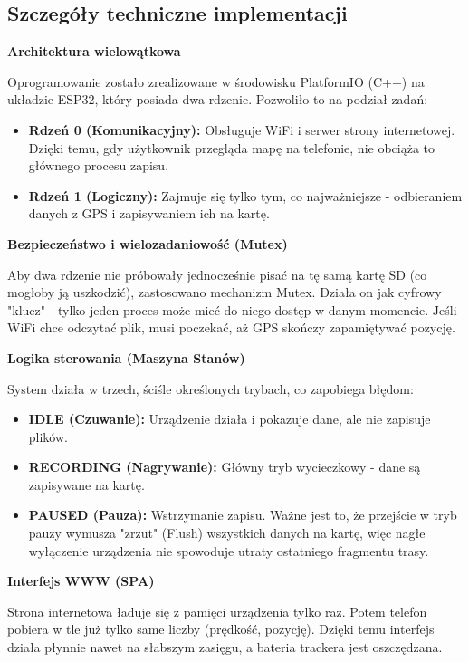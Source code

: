 \documentclass[12pt, a4paper]{EE-dyplom}
\begin{document}
\subsection{Szczegóły techniczne implementacji}

\textbf{Architektura wielowątkowa}

Oprogramowanie zostało zrealizowane w środowisku PlatformIO (C++) na układzie ESP32, który posiada dwa rdzenie. Pozwoliło to na podział zadań:
\begin{itemize}
    \item \textbf{Rdzeń 0 (Komunikacyjny):} Obsługuje WiFi i serwer strony internetowej. Dzięki temu, gdy użytkownik przegląda mapę na telefonie, nie obciąża to głównego procesu zapisu.
    \item \textbf{Rdzeń 1 (Logiczny):} Zajmuje się tylko tym, co najważniejsze - odbieraniem danych z GPS i zapisywaniem ich na kartę.
\end{itemize}

\vspace{0.5cm}
\textbf{Bezpieczeństwo i wielozadaniowość (Mutex)}

Aby dwa rdzenie nie próbowały jednocześnie pisać na tę samą kartę SD (co mogłoby ją uszkodzić), zastosowano mechanizm Mutex. Działa on jak cyfrowy "klucz" - tylko jeden proces może mieć do niego dostęp w danym momencie. Jeśli WiFi chce odczytać plik, musi poczekać, aż GPS skończy zapamiętywać pozycję.

\vspace{0.5cm}
\textbf{Logika sterowania (Maszyna Stanów)}

System działa w trzech, ściśle określonych trybach, co zapobiega błędom:
\begin{itemize}
    \item \textbf{IDLE (Czuwanie):} Urządzenie działa i pokazuje dane, ale nie zapisuje plików.
    \item \textbf{RECORDING (Nagrywanie):} Główny tryb wycieczkowy - dane są zapisywane na kartę.
    \item \textbf{PAUSED (Pauza):} Wstrzymanie zapisu. Ważne jest to, że przejście w tryb pauzy wymusza "zrzut" (Flush) wszystkich danych na kartę, więc nagłe wyłączenie urządzenia nie spowoduje utraty ostatniego fragmentu trasy.
\end{itemize}

\vspace{0.5cm}
\textbf{Interfejs WWW (SPA)}

Strona internetowa ładuje się z pamięci urządzenia tylko raz. Potem telefon pobiera w tle już tylko same liczby (prędkość, pozycję). Dzięki temu interfejs działa płynnie nawet na słabszym zasięgu, a bateria trackera jest oszczędzana.
\end{document}
